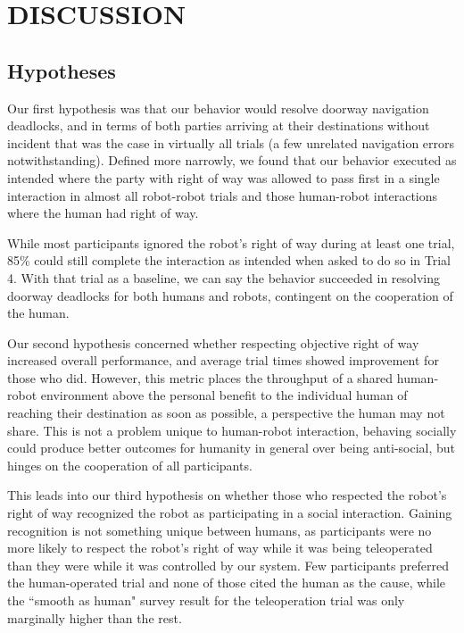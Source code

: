 \documentclass[letterpaper, 10 pt, conference]{ieeeconf}  %
\begin{document}
\section{DISCUSSION}

\subsection{Hypotheses}

Our first hypothesis was that our behavior would resolve doorway navigation deadlocks, and in terms of both parties arriving at their destinations without incident that was the case in virtually all trials (a few unrelated navigation errors notwithstanding). Defined more narrowly, we found that our behavior executed as intended where the party with right of way was allowed to pass first in a single interaction in almost all robot-robot trials and those human-robot interactions where the human had right of way. 

While most participants ignored the robot's right of way during at least one trial, 85\% could still complete the interaction as intended when asked to do so in Trial 4. With that trial as a baseline, we can say the behavior succeeded in resolving doorway deadlocks for both humans and robots, contingent on the cooperation of the human.

Our second hypothesis concerned whether respecting objective right of way increased overall performance, and average trial times showed  improvement for those who did. However, this metric places the throughput of a shared human-robot environment above the personal benefit to the individual human of reaching their destination as soon as possible, a perspective the human may not share. This is not a problem unique to human-robot interaction, behaving socially could produce better outcomes for humanity in general over being anti-social, but hinges on the cooperation of all participants.

This leads into our third hypothesis on whether those who respected the robot's right of way recognized the robot as participating in a social interaction. Gaining recognition is not something unique between humans, as participants were no more likely to respect the robot's right of way while it was being teleoperated than they were while it was controlled by our system. Few participants preferred the human-operated trial and none of those cited the human as the cause, while the ``smooth as human" survey result for the teleoperation trial was only marginally higher than the rest.
\end{document}
